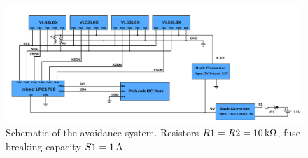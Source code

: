 \begin{landscape}
	\begin{figure}
		\centering
		\includegraphics[width=\linewidth]{pictures/wire_schematic.pdf}
		\caption{Schematic of the avoidance system. Resistors $R1=R2=\unit[10]{k\Omega}$, fuse breaking capacity $S1=\unit[1]{A}$.}
		\label{fig:schematics}
	\end{figure}
\end{landscape}




